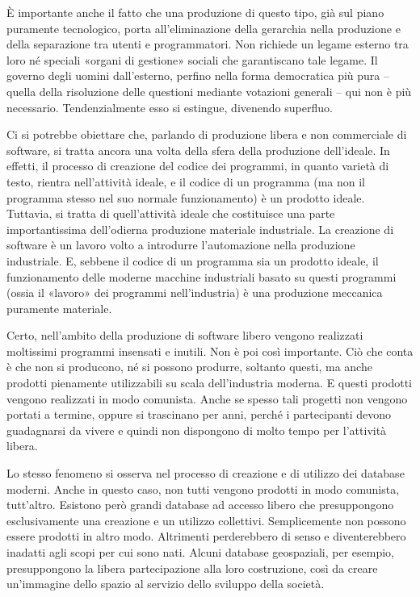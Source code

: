 \documentclass[../main]{subfiles}
\begin{document}
È importante anche il fatto che una produzione di questo tipo, già sul piano puramente tecnologico, porta all'eliminazione della gerarchia nella produzione e della separazione tra utenti e programmatori. Non richiede un legame esterno tra loro né speciali «organi di gestione» sociali che garantiscano tale legame. Il governo degli uomini dall'esterno, perfino nella forma democratica più pura – quella della risoluzione delle questioni mediante votazioni generali – qui non è più necessario. Tendenzialmente esso si estingue, divenendo superfluo.

Ci si potrebbe obiettare che, parlando di produzione libera e non commerciale di software, si tratta ancora una volta della sfera della produzione dell'ideale. In effetti, il processo di creazione del codice dei programmi, in quanto varietà di testo, rientra nell'attività ideale, e il codice di un programma (ma non il programma stesso nel suo normale funzionamento) è un prodotto ideale. Tuttavia, si tratta di quell'attività ideale che costituisce una parte importantissima dell'odierna produzione materiale industriale. La creazione di software è un lavoro volto a introdurre l'automazione nella produzione industriale. E, sebbene il codice di un programma sia un prodotto ideale, il funzionamento delle moderne macchine industriali basato su questi programmi (ossia il «lavoro» dei programmi nell'industria) è una produzione meccanica puramente materiale.

Certo, nell'ambito della produzione di software libero vengono realizzati moltissimi programmi insensati e inutili. Non è poi così importante. Ciò che conta è che non si producono, né si possono produrre, soltanto questi, ma anche prodotti pienamente utilizzabili su scala dell'industria moderna. E questi prodotti vengono realizzati in modo comunista. Anche se spesso tali progetti non vengono portati a termine, oppure si trascinano per anni, perché i partecipanti devono guadagnarsi da vivere e quindi non dispongono di molto tempo per l'attività libera.

Lo stesso fenomeno si osserva nel processo di creazione e di utilizzo dei database moderni. Anche in questo caso, non tutti vengono prodotti in modo comunista, tutt'altro. Esistono però grandi database ad accesso libero che presuppongono esclusivamente una creazione e un utilizzo collettivi. Semplicemente non possono essere prodotti in altro modo. Altrimenti perderebbero di senso e diventerebbero inadatti agli scopi per cui sono nati. Alcuni database geospaziali, per esempio, presuppongono la libera partecipazione alla loro costruzione, così da creare un'immagine dello spazio al servizio dello sviluppo della società.
\end{document}
